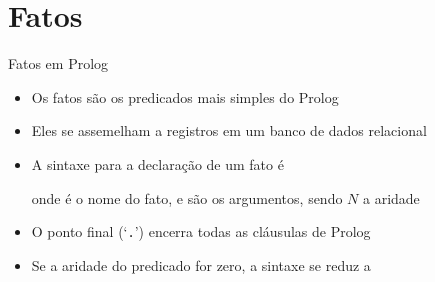 \section{Fatos}

\begin{frame}[fragile]{Fatos em Prolog}

    \begin{itemize}
        \item Os fatos são os predicados mais simples do Prolog

        \item Eles se assemelham a registros em um banco de dados relacional

        \item A sintaxe para a declaração de um fato é


        onde  é o nome do fato, e 
        são os argumentos, sendo $N$ a aridade

        \item O ponto final (`\texttt{.}') encerra todas as cláusulas de Prolog

        \item Se a aridade do predicado for zero, a sintaxe se reduz a


    \end{itemize}

\end{frame}


